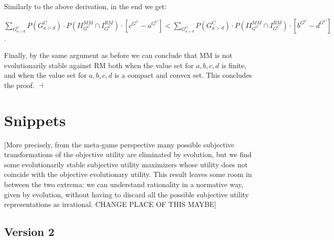 \documentclass[fleqn,reqno,11pt]{article}
\begin{document}
\noindent Similarly to the above derivation, in the end we get: 

\medskip{}

\noindent $\sum_{G_{a>d}^{C}}P(G_{a>d}^{C})\cdot P(II_{G^{C}}^{MM}\cap I_{G^{C}}^{RM})\cdot[c^{G^{C}}-a^{G^{C}}]<\sum_{G_{a>d}^{C}}P(G_{a>d}^{C})\cdot P(II_{G^{C}}^{MM}\cap I_{G^{C}}^{RM})\cdot[b^{G^{C}}-d^{G^{C}}]$.

\medskip{}


\noindent Finally, by the same argument as before we can conclude that MM is
not evolutionarily stable against RM both when the value set for $a,b,c,d$
is finite, and when the value set for $a,b,c,d$ is a compact and
convex set. This concludes the proof. $\dashv$

\printbibliography[heading=bibintoc]


\newpage

\section*{Snippets}

[More precisely, from the meta-game perspective many possible subjective
transformations of the objective utility are eliminated by evolution, but we find some
evolutionarily stable subjective utility maximizers whose utility does not coincide with the
objective evolutionary utility. This result leaves some room in between the two extrema: we can
understand rationality in a normative way, given by evolution, without having to discard all
the possible subjective utility representations as irrational. CHANGE PLACE OF THIS MAYBE]



\subsection{Version 2}
\end{document}
